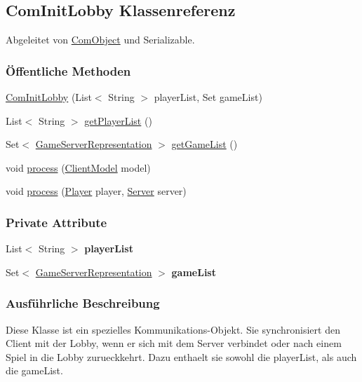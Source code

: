 \hypertarget{a00032}{\subsection{Com\-Init\-Lobby Klassenreferenz}
\label{a00032}
}


Abgeleitet von \hyperlink{a00037}{Com\-Object} und Serializable.

\subsubsection*{Öffentliche Methoden}
\begin{DoxyCompactItemize}
\item 
\hyperlink{a00032_a739c264cffc9883b63ea38438d5f3c34}{Com\-Init\-Lobby} (List$<$ String $>$ player\-List, Set game\-List)
\item 
List$<$ String $>$ \hyperlink{a00032_a806a371665b36cee69f0a49625a8c20d}{get\-Player\-List} ()
\item 
Set$<$ \hyperlink{a00073}{Game\-Server\-Representation} $>$ \hyperlink{a00032_a822c2e599facf6d9395cc799975c4ab1}{get\-Game\-List} ()
\item 
void \hyperlink{a00032_a758d7005755a181717f238f714d87dd2}{process} (\hyperlink{a00003}{Client\-Model} model)
\item 
void \hyperlink{a00032_ac67b5ce3ec03d48ef1e6caad6e49c902}{process} (\hyperlink{a00076}{Player} player, \hyperlink{a00077}{Server} server)
\end{DoxyCompactItemize}
\subsubsection*{Private Attribute}
\begin{DoxyCompactItemize}
\item 
\hypertarget{a00032_a2a62caed4423183b9e69deb6560b136f}{List$<$ String $>$ {\bfseries player\-List}}\label{a00032_a2a62caed4423183b9e69deb6560b136f}

\item 
\hypertarget{a00032_a3181880192ac35123553866694553d59}{Set$<$ \hyperlink{a00073}{Game\-Server\-Representation} $>$ {\bfseries game\-List}}\label{a00032_a3181880192ac35123553866694553d59}

\end{DoxyCompactItemize}


\subsubsection{Ausführliche Beschreibung}
Diese Klasse ist ein spezielles Kommunikations-\/\-Objekt. Sie synchronisiert den Client mit der Lobby, wenn er sich mit dem Server verbindet oder nach einem Spiel in die Lobby zurueckkehrt. Dazu enthaelt sie sowohl die player\-List, als auch die game\-List. 

